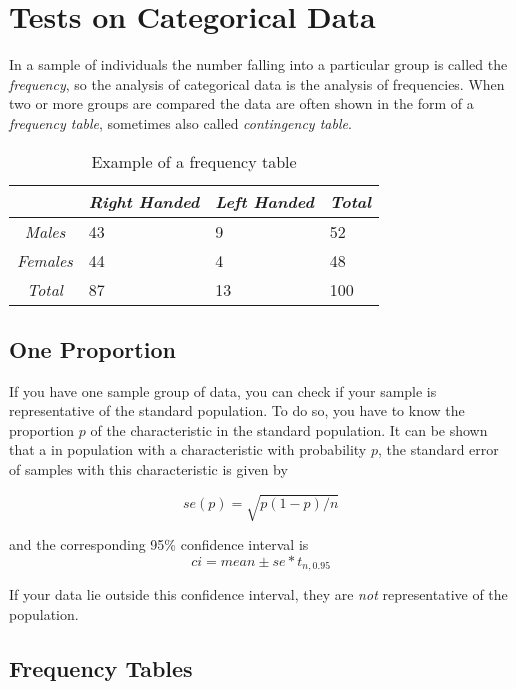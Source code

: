 \chapter{Tests on Categorical Data }

In a sample of individuals the number falling into a particular group is called the \emph{frequency}, so the analysis of categorical data is the analysis of frequencies. When two or more groups are compared the data are often shown in the form of a \emph{frequency table}, sometimes also called \emph{contingency table}.

\begin{table}
  \centering
  \begin{tabular}{|c|l l l|}
  \hline
  & \emph{Right Handed} & \emph{Left Handed} & \emph{Total} \\
  \hline
  \emph{Males} & 43 & 9 & 52 \\
  \emph{Females} & 44 & 4 & 48 \\
  \emph{Total} & 87 & 13 & 100 \\
  \hline
  \end{tabular}

  \caption{Example of a frequency table}\label{table:frequency}
\end{table}


\section{One Proportion }

If you have one sample group of data, you can check if your sample is representative of the standard population. To do so, you have to know the proportion $p$ of the characteristic in the standard population. It can be shown that a in population with a characteristic with probability $p$, the standard error of samples with this characteristic is given by

\begin{equation}
  se(p) = \sqrt{p(1-p)/n}
\end{equation}

and the corresponding 95\% confidence interval is
\begin{equation*}
  ci = mean \pm se * t_{n,0.95}
\end{equation*}

If your data lie outside this confidence interval, they are \emph{not} representative of the population.

\section{Frequency Tables} 

